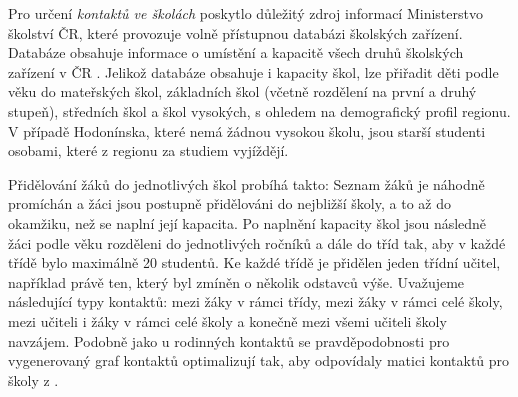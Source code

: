 

Pro určení \emph{kontaktů ve školách} poskytlo důležitý zdroj informací Ministerstvo školství ČR, které provozuje volně přístupnou databázi školských zařízení. Databáze obsahuje informace o umístění a kapacitě všech druhů školských zařízení v ČR \cite{zaj:skolskazarizeni}. Jelikož databáze obsahuje i kapacity škol, lze přiřadit děti podle věku do mateřských škol, základních škol (včetně rozdělení na první a druhý stupeň), středních škol a škol vysokých, s ohledem na demografický profil regionu. V případě Hodonínska, které nemá žádnou vysokou školu, jsou starší studenti osobami, které z regionu za studiem vyjíždějí.

Přidělování žáků do jednotlivých škol probíhá takto: Seznam žáků je náhodně promíchán a žáci jsou postupně přidělováni do nejbližší školy, a to až do okamžiku, než se naplní její kapacita. Po naplnění kapacity škol jsou následně žáci podle věku rozděleni do jednotlivých ročníků a dále do tříd tak, aby v každé třídě bylo maximálně 20 studentů. Ke každé třídě je přidělen jeden třídní učitel, například právě ten, který byl zmíněn o několik odstavců výše. 
Uvažujeme následující typy kontaktů: mezi žáky v rámci třídy, mezi žáky v rámci celé školy, mezi učiteli i žáky v rámci celé školy a konečně mezi všemi učiteli školy navzájem.
Podobně jako u rodinných kontaktů se pravděpodobnosti pro vygenerovaný graf kontaktů optimalizují tak, aby odpovídaly matici kontaktů pro školy z \cite{Prem_etal2017}.


